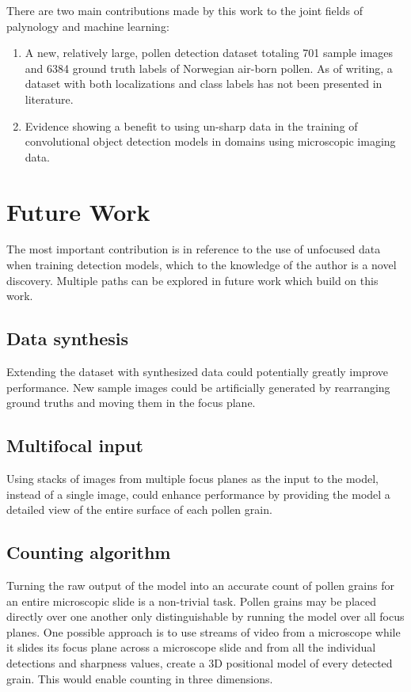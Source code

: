 There are two main contributions made by this work to the joint fields of palynology and machine learning:

\begin{enumerate}
    \item A new, relatively large, pollen detection dataset totaling 701 sample images and 6384 ground truth labels of Norwegian air-born pollen. As of writing, a dataset with both localizations and class labels has not been presented in literature.
    \item Evidence showing a benefit to using un-sharp data in the training of convolutional object detection models in domains using microscopic imaging data.
\end{enumerate}

\section{Future Work}
The most important contribution is in reference to the use of unfocused data when training detection models, which to the knowledge of the author is a novel discovery.
Multiple paths can be explored in future work which build on this work.

\subsection*{Data synthesis}
Extending the dataset with synthesized data could potentially greatly improve performance.
New sample images could be artificially generated by rearranging ground truths and moving them in the focus plane.

\subsection*{Multifocal input}
Using stacks of images from multiple focus planes as the input to the model, instead of a single image, could enhance performance by providing the model a detailed view of the entire surface of each pollen grain.

\subsection*{Counting algorithm}
Turning the raw output of the model into an accurate count of pollen grains for an entire microscopic slide is a non-trivial task.
Pollen grains may be placed directly over one another only distinguishable by running the model over all focus planes.
One possible approach is to use streams of video from a microscope while it slides its focus plane across a microscope slide and from all the individual detections and sharpness values, create a 3D positional model of every detected grain.
This would enable counting in three dimensions.

